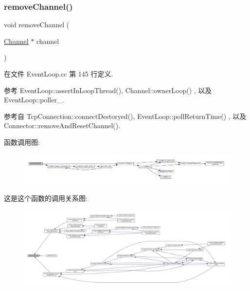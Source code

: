 \subsubsection{\texorpdfstring{remove\+Channel()}{removeChannel()}}
{\footnotesize\ttfamily void remove\+Channel (\begin{DoxyParamCaption}\item[{\hyperlink{classmuduo_1_1Channel}{Channel} $\ast$}]{channel }\end{DoxyParamCaption})}



在文件 Event\+Loop.\+cc 第 145 行定义.



参考 Event\+Loop\+::assert\+In\+Loop\+Thread(), Channel\+::owner\+Loop() , 以及 Event\+Loop\+::poller\+\_\+.



参考自 Tcp\+Connection\+::connect\+Destoryed(), Event\+Loop\+::poll\+Return\+Time() , 以及 Connector\+::remove\+And\+Reset\+Channel().

函数调用图\+:
\nopagebreak
\begin{figure}[H]
\begin{center}
\leavevmode
\includegraphics[width=350pt]{classmuduo_1_1EventLoop_ab10f76c92cb5269f8296e5b3e4dd0ef9_cgraph}
\end{center}
\end{figure}
这是这个函数的调用关系图\+:
\nopagebreak
\begin{figure}[H]
\begin{center}
\leavevmode
\includegraphics[width=350pt]{classmuduo_1_1EventLoop_ab10f76c92cb5269f8296e5b3e4dd0ef9_icgraph}
\end{center}
\end{figure}
\mbox{\label{classmuduo_1_1EventLoop_ae770f8cb708dfacf455d71d6977e5436}} 

